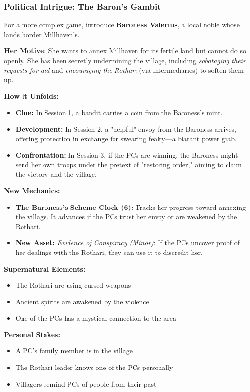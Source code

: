 \documentclass[11pt]{article}
\newenvironment{mechanic}[1]{%
  \begin{mdframed}[backgroundcolor=tableheader, linewidth=1pt, linecolor=accentcolor]%
  \subsubsection*{#1}%
}{%
  \end{mdframed}%
}
\begin{document}
\begin{mechanic}{Political Intrigue: The Baron's Gambit}

For a more complex game, introduce \textbf{Baroness Valerius}, a local noble whose lands border Millhaven's.

\textbf{Her Motive:} She wants to annex Millhaven for its fertile land but cannot do so openly. She has been secretly undermining the village, including \textit{sabotaging their requests for aid} and \textit{encouraging the Rothari} (via intermediaries) to soften them up.

\textbf{How it Unfolds:}
\begin{itemize}
\item \textbf{Clue:} In Session 1, a bandit carries a coin from the Baroness's mint.
\item \textbf{Development:} In Session 2, a "helpful" envoy from the Baroness arrives, offering protection in exchange for swearing fealty—a blatant power grab.
\item \textbf{Confrontation:} In Session 3, if the PCs are winning, the Baroness might send her own troops under the pretext of "restoring order," aiming to claim the victory and the village.
\end{itemize}

\textbf{New Mechanics:}
\begin{itemize}
\item \textbf{The Baroness's Scheme Clock (6):} Tracks her progress toward annexing the village. It advances if the PCs trust her envoy or are weakened by the Rothari.
\item \textbf{New Asset:} \textit{Evidence of Conspiracy (Minor)}: If the PCs uncover proof of her dealings with the Rothari, they can use it to discredit her.
\end{itemize}

\end{mechanic}

\textbf{Supernatural Elements:}
\begin{itemize}
\item The Rothari are using cursed weapons
\item Ancient spirits are awakened by the violence
\item One of the PCs has a mystical connection to the area
\end{itemize}

\textbf{Personal Stakes:}
\begin{itemize}
\item A PC's family member is in the village
\item The Rothari leader knows one of the PCs personally
\item Villagers remind PCs of people from their past
\end{itemize}
\end{document}
